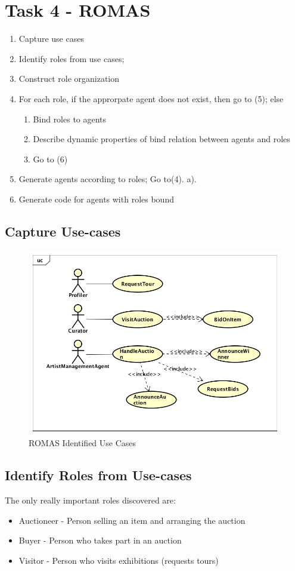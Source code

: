 \documentclass[a4paper, 11pt]{article}
\begin{document}
\section{Task 4 - ROMAS}
\begin{enumerate}
\item Capture use cases
\item Identify roles from use cases;
\item Construct role organization
\item For each role, if the approrpate agent does not exist, then go to (5); else
\begin{enumerate}
\item Bind roles to agents
\item Describe dynamic properties of bind relation between agents and roles
\item Go to (6)
\end{enumerate}
\item Generate agents according to roles; Go to(4). a).
\item Generate code for agents with roles bound
\end{enumerate}
\subsection{Capture Use-cases}
\begin{figure}[H]
	\caption{ROMAS Identified Use Cases}
	\centering
	\includegraphics[width=\textwidth]{./images/ROMASusecases.png}
\end{figure}

\subsection{Identify Roles from Use-cases}
The only really important roles discovered are:
\begin{itemize}
\item Auctioneer - Person selling an item and arranging the auction
\item Buyer - Person who takes part in an auction
\item Visitor - Person who visits exhibitions (requests tours)
\end{itemize}
\end{document}
